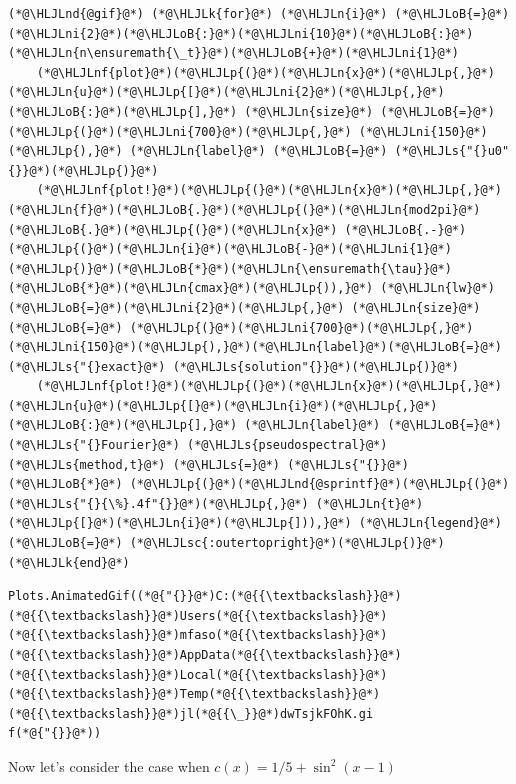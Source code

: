 \documentclass[12pt,a4paper]{article}
\newcommand{\HLJLk}[1]{\textcolor[RGB]{148,91,176}{\textbf{#1}}}
\newcommand{\HLJLn}[1]{#1}
\newcommand{\HLJLnd}[1]{\textcolor[RGB]{214,102,97}{#1}}
\newcommand{\HLJLnf}[1]{\textcolor[RGB]{66,102,213}{#1}}
\newcommand{\HLJLs}[1]{\textcolor[RGB]{201,61,57}{#1}}
\newcommand{\HLJLsc}[1]{\textcolor[RGB]{201,61,57}{#1}}
\newcommand{\HLJLni}[1]{\textcolor[RGB]{59,151,46}{#1}}
\newcommand{\HLJLoB}[1]{\textcolor[RGB]{102,102,102}{\textbf{#1}}}
\newcommand{\HLJLp}[1]{#1}
\begin{document}
\begin{lstlisting}
(*@\HLJLnd{@gif}@*) (*@\HLJLk{for}@*) (*@\HLJLn{i}@*) (*@\HLJLoB{=}@*) (*@\HLJLni{2}@*)(*@\HLJLoB{:}@*)(*@\HLJLni{10}@*)(*@\HLJLoB{:}@*)(*@\HLJLn{n\ensuremath{\_t}}@*)(*@\HLJLoB{+}@*)(*@\HLJLni{1}@*)
    (*@\HLJLnf{plot}@*)(*@\HLJLp{(}@*)(*@\HLJLn{x}@*)(*@\HLJLp{,}@*) (*@\HLJLn{u}@*)(*@\HLJLp{[}@*)(*@\HLJLni{2}@*)(*@\HLJLp{,}@*)(*@\HLJLoB{:}@*)(*@\HLJLp{],}@*) (*@\HLJLn{size}@*) (*@\HLJLoB{=}@*) (*@\HLJLp{(}@*)(*@\HLJLni{700}@*)(*@\HLJLp{,}@*) (*@\HLJLni{150}@*)(*@\HLJLp{),}@*) (*@\HLJLn{label}@*) (*@\HLJLoB{=}@*) (*@\HLJLs{"{}u0"{}}@*)(*@\HLJLp{)}@*)
    (*@\HLJLnf{plot!}@*)(*@\HLJLp{(}@*)(*@\HLJLn{x}@*)(*@\HLJLp{,}@*) (*@\HLJLn{f}@*)(*@\HLJLoB{.}@*)(*@\HLJLp{(}@*)(*@\HLJLn{mod2pi}@*)(*@\HLJLoB{.}@*)(*@\HLJLp{(}@*)(*@\HLJLn{x}@*) (*@\HLJLoB{.-}@*) (*@\HLJLp{(}@*)(*@\HLJLn{i}@*)(*@\HLJLoB{-}@*)(*@\HLJLni{1}@*)(*@\HLJLp{)}@*)(*@\HLJLoB{*}@*)(*@\HLJLn{\ensuremath{\tau}}@*)(*@\HLJLoB{*}@*)(*@\HLJLn{cmax}@*)(*@\HLJLp{)),}@*) (*@\HLJLn{lw}@*)(*@\HLJLoB{=}@*)(*@\HLJLni{2}@*)(*@\HLJLp{,}@*) (*@\HLJLn{size}@*) (*@\HLJLoB{=}@*) (*@\HLJLp{(}@*)(*@\HLJLni{700}@*)(*@\HLJLp{,}@*) (*@\HLJLni{150}@*)(*@\HLJLp{),}@*)(*@\HLJLn{label}@*)(*@\HLJLoB{=}@*)(*@\HLJLs{"{}exact}@*) (*@\HLJLs{solution"{}}@*)(*@\HLJLp{)}@*)
    (*@\HLJLnf{plot!}@*)(*@\HLJLp{(}@*)(*@\HLJLn{x}@*)(*@\HLJLp{,}@*) (*@\HLJLn{u}@*)(*@\HLJLp{[}@*)(*@\HLJLn{i}@*)(*@\HLJLp{,}@*)(*@\HLJLoB{:}@*)(*@\HLJLp{],}@*) (*@\HLJLn{label}@*) (*@\HLJLoB{=}@*) (*@\HLJLs{"{}Fourier}@*) (*@\HLJLs{pseudospectral}@*) (*@\HLJLs{method,t}@*) (*@\HLJLs{=}@*) (*@\HLJLs{"{}}@*) (*@\HLJLoB{*}@*) (*@\HLJLp{(}@*)(*@\HLJLnd{@sprintf}@*)(*@\HLJLp{(}@*)(*@\HLJLs{"{}{\%}.4f"{}}@*)(*@\HLJLp{,}@*) (*@\HLJLn{t}@*)(*@\HLJLp{[}@*)(*@\HLJLn{i}@*)(*@\HLJLp{])),}@*) (*@\HLJLn{legend}@*) (*@\HLJLoB{=}@*) (*@\HLJLsc{:outertopright}@*)(*@\HLJLp{)}@*)
(*@\HLJLk{end}@*)
\end{lstlisting}

\begin{lstlisting}
Plots.AnimatedGif((*@{"{}}@*)C:(*@{{\textbackslash}}@*)(*@{{\textbackslash}}@*)Users(*@{{\textbackslash}}@*)(*@{{\textbackslash}}@*)mfaso(*@{{\textbackslash}}@*)(*@{{\textbackslash}}@*)AppData(*@{{\textbackslash}}@*)(*@{{\textbackslash}}@*)Local(*@{{\textbackslash}}@*)(*@{{\textbackslash}}@*)Temp(*@{{\textbackslash}}@*)(*@{{\textbackslash}}@*)jl(*@{{\_}}@*)dwTsjkFOhK.gi
f(*@{"{}}@*))
\end{lstlisting}


Now let's consider the case when $c(x) = 1/5 + \sin^2(x-1)$
\end{document}
